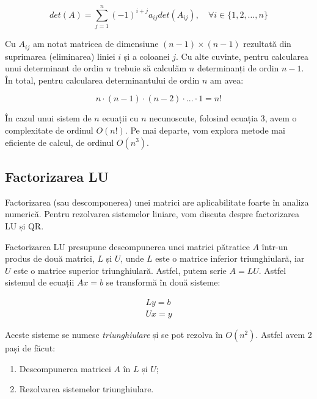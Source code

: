 \documentclass{exam}
\begin{document}
\begin{equation}
	det(A) = \sum_{j = 1}^{n}{(-1)^{i + j} a_{ij} det(A_{ij})}, \quad \forall i \in \{1, 2, \ldots, n\}
\end{equation}

\par Cu $A_{ij}$ am notat matricea de dimensiune $(n - 1) \times (n - 1)$
rezultată din suprimarea (eliminarea) liniei $i$ și a coloanei $j$. Cu alte
cuvinte, pentru calcularea unui determinant de ordin $n$ trebuie să calculăm
$n$ determinanți de ordin $n - 1$. În total, pentru calcularea determinantului
de ordin $n$ am avea:

\begin{equation}
	n \cdot (n - 1) \cdot (n - 2) \cdot ... \cdot 1 = n!
\end{equation}

\par În cazul unui sistem de $n$ ecuații cu $n$ necunoscute, folosind ecuația 3,
avem o complexitate de ordinul $O(n!)$. Pe mai departe, vom explora metode mai
eficiente de calcul, de ordinul $O(n^3)$.

\newpage
\subsection{Factorizarea LU}

\par Factorizarea (sau descomponerea) unei matrici are aplicabilitate foarte
în analiza numerică. Pentru rezolvarea sistemelor liniare, vom discuta despre
factorizarea LU și QR.

\par Factorizarea LU presupune descompunerea unei matrici pătratice $A$ într-un
produs de două matrici, $L$ și $U$, unde $L$ este o matrice inferior
triunghiulară, iar $U$ este o matrice superior triunghiulară. Astfel, putem
scrie $A = LU$. Astfel sistemul de ecuații $Ax = b$ se transformă în două
sisteme:

\begin{gather*}
	Ly = b \\
	Ux = y
\end{gather*}

\par Aceste sisteme se numesc \textit{triunghiulare} și se pot rezolva în $O(n^2)$.
Astfel avem 2 pași de făcut:

\begin{enumerate}
	\item Descompunerea matricei $A$ în $L$ și $U$;
	\item Rezolvarea sistemelor triunghiulare.
\end{enumerate}
\end{document}
